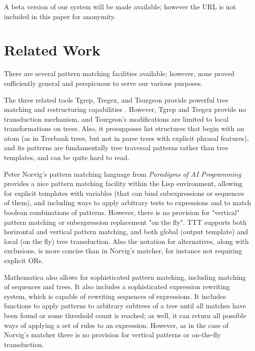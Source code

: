\documentclass[11pt]{article}
\begin{document}
A beta version of our system will be made available; however the URL is not included in this paper for anonymity. 


\section{Related Work}
There are several pattern matching facilities available; however, none proved sufficiently general and perspicuous to serve our various purposes.

The three related tools Tgrep, Tregex, and Tsurgeon provide powerful tree matching and restructuring capabilities \cite{Levy-Andrew:2006}. However, Tgrep and Tregex provide no transduction mechanism, and Tsurgeon's modifications are limited to local transformations on trees. Also, it presupposes list structures that begin with an atom (as in Treebank trees, but not in parse trees with explicit phrasal features), and its patterns are fundamentally tree traversal patterns rather than tree templates, and can be quite hard to read. 

Peter Norvig's pattern matching language from {\it Paradigms of AI Programming} provides a nice pattern matching facility within the Lisp environment, allowing for explicit templates with variables (that can bind subexpressions or sequences of them), and including ways to apply arbitrary tests to expressions and to match boolean combinations of patterns. However, there is no provision for "vertical" pattern matching or subexpression replacement "on the fly". TTT supports both horizontal and vertical pattern matching, and both global (output template) and local (on the fly) tree transduction. Also the notation for alternatives, along with exclusions, is more concise than in Norvig's matcher, for instance not requiring explicit ORs.

Mathematica also allows for sophisticated pattern matching, including matching of sequences and trees.  It also includes a sophisticated expression rewriting system, which is capable of rewriting sequences of expressions.  It includes functions to apply patterns to arbitrary subtrees of a tree until all matches have been found or some threshold count is reached; as well, it can return all possible ways of applying a set of rules to an expression. However, as in the case of Norvig's matcher there is no provision for vertical patterns or on-the-fly transduction. \cite{Wolfram:2010}
\end{document}
